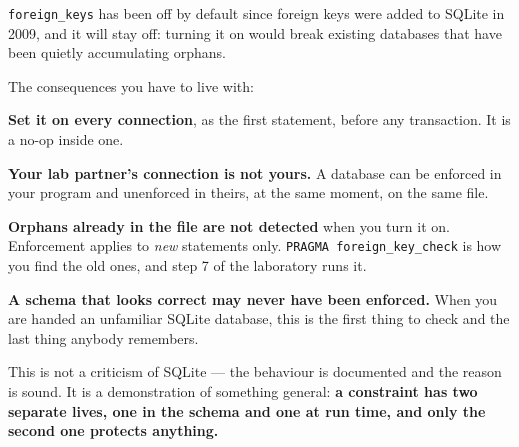\begin{alertbox}
 \texttt{foreign\_keys} has been off by default since foreign
keys were added to SQLite in 2009, and it will stay off: turning it on would
break existing databases that have been quietly accumulating orphans.

\smallskip
The consequences you have to live with:

\begin{tight}
  \item \textbf{Set it on every connection}, as the first statement, before
        any transaction. It is a no-op inside one.
  \item \textbf{Your lab partner's connection is not yours.} A database can be
        enforced in your program and unenforced in theirs, at the same moment,
        on the same file.
  \item \textbf{Orphans already in the file are not detected} when you turn it
        on. Enforcement applies to \emph{new} statements only.
        \texttt{PRAGMA foreign\_key\_check} is how you find the old ones, and
        step 7 of the laboratory runs it.
  \item \textbf{A schema that looks correct may never have been enforced.}
        When you are handed an unfamiliar SQLite database, this is the first
        thing to check and the last thing anybody remembers.
\end{tight}

\smallskip
This is not a criticism of SQLite --- the behaviour is documented and the
reason is sound. It is a demonstration of something general: \textbf{a
constraint has two separate lives, one in the schema and one at run time, and
only the second one protects anything.}
\end{alertbox}

